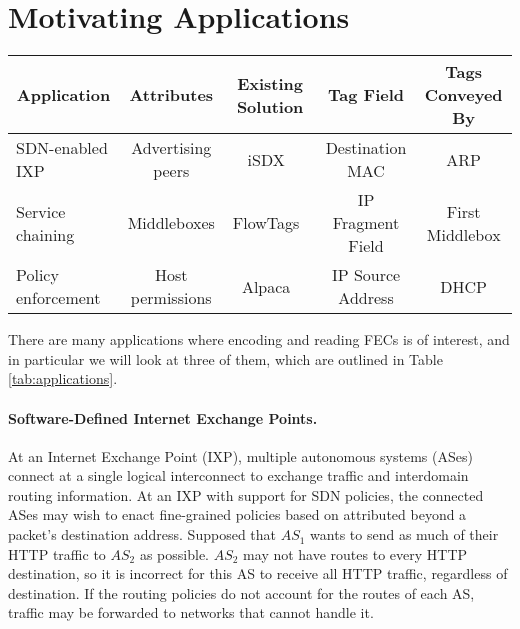 

\section{Motivating Applications}\label{sec:motivation}
\begin{table*}[t]
\begin{center}
    \begin{tabular}{|l|c|c|c|c|}
    \hline
    \multicolumn{1}{|c|}{\bf Application} & 
    \multicolumn{1}{c|}{\bf Attributes} & 
    \multicolumn{1}{c|}{\bf Existing Solution} & 
    \multicolumn{1}{c|}{\bf Tag Field} & 
    \multicolumn{1}{c|}{\bf Tags Conveyed By}\\ \hline
    SDN-enabled IXP & Advertising peers & iSDX~\cite{isdx} & Destination MAC & ARP \\ \hline
    Service chaining & Middleboxes & FlowTags~\cite{flowtags} & IP Fragment Field & First Middlebox \\ \hline
    Policy enforcement & Host permissions & Alpaca~\cite{alpaca} & IP Source Address & DHCP \\ \hline
    \end{tabular}
\end{center}
    \caption{Example applications and systems which have solved them by some form of tagging.} 
    \label{tab:applications}
\end{table*}

There are many applications where encoding and reading FECs is of interest, and in particular we will look at three of them, which are outlined in Table \ref{tab:applications}.
 
\paragraph{Software-Defined Internet Exchange Points.}
At an Internet Exchange Point (IXP), multiple autonomous systems (ASes)
connect at a single logical interconnect to exchange traffic and
interdomain routing information.  At an IXP with support for SDN
policies, the connected ASes may wish to enact fine-grained 
policies based on attributed beyond a packet's destination
address. Supposed that $AS_1$ wants to send as much of their HTTP traffic
to $AS_2$ as possible. $AS_2$ may not have routes to every HTTP
destination, so it is incorrect for this AS to receive all HTTP traffic,
regardless of destination. If
the routing policies do not account for the routes of each AS, traffic
may be forwarded to networks that cannot handle it.

